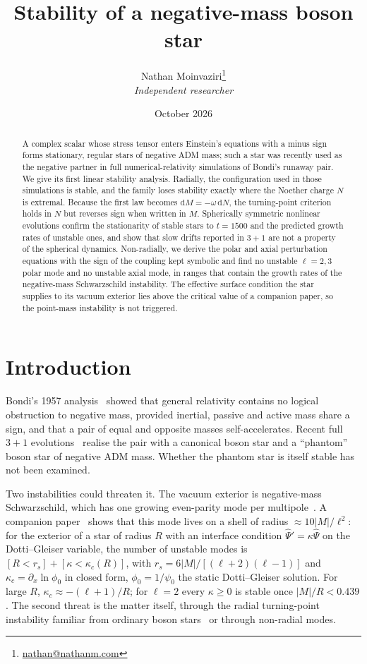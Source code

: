 \documentclass[11pt]{article}
\title{Stability of a negative-mass boson star}
\author{Nathan Moinvaziri\thanks{\href{mailto:nathan@nathanm.com}{nathan@nathanm.com}}\\[2pt]
\normalsize\textit{Independent researcher}}
\date{October 2026}
\theoremstyle{remark}
\newcommand{\dd}{\mathrm{d}}
\begin{document}
\maketitle

\begin{abstract}
A complex scalar whose stress tensor enters Einstein's equations with a minus sign forms stationary, regular stars of
negative ADM mass; such a star was recently used as the negative partner in full numerical-relativity simulations of
Bondi's runaway pair. We give its first linear stability analysis. Radially, the configuration used in those simulations
is stable, and the family loses stability exactly where the Noether charge $N$ is extremal. Because the first law
becomes $\dd M=-\omega\,\dd N$, the turning-point criterion holds in $N$ but reverses sign when written in $M$.
Spherically symmetric nonlinear evolutions confirm the stationarity of stable stars to $t=1500$ and the predicted growth
rates of unstable ones, and show that slow drifts reported in $3+1$ are not a property of the spherical dynamics.
Non-radially, we derive the polar and axial perturbation equations with the sign of the coupling kept symbolic and find
no unstable $\ell=2,3$ polar mode and no unstable axial mode, in ranges that contain the growth rates of the
negative-mass Schwarzschild instability. The effective surface condition the star supplies to its vacuum exterior lies
above the critical value of a companion paper, so the point-mass instability is not triggered.
\end{abstract}

\tableofcontents

\section{Introduction}

Bondi's 1957 analysis~\cite{Bondi1957} showed that general relativity contains no logical obstruction to negative
mass, provided inertial, passive and active mass share a sign, and that a pair of equal and opposite masses
self-accelerates. Recent full $3+1$ evolutions~\cite{Shirokov2026} realise the pair with a canonical boson star and a
``phantom'' boson star of negative ADM mass. Whether the phantom star is itself stable has not been examined.

Two instabilities could threaten it. The vacuum exterior is negative-mass Schwarzschild, which has one growing
even-parity mode per multipole~\cite{GD2006,DG2009}. A companion paper~\cite{Moinvaziri2026a} shows that this mode lives on a
shell of radius $\approx10|M|/\ell^2$: for the exterior of a star of radius $R$ with an interface condition
$\hat\Psi'=\kappa\hat\Psi$ on the Dotti--Gleiser variable, the number of unstable modes is
$[R<r_s]+[\kappa<\kappa_c(R)]$, with $r_s=6|M|/[(\ell+2)(\ell-1)]$ and $\kappa_c=\partial_x\ln\phi_0$ in closed form,
$\phi_0=1/\psi_0$ the static Dotti--Gleiser solution. For large $R$, $\kappa_c\approx-(\ell+1)/R$; for $\ell=2$ every
$\kappa\ge0$ is stable once $|M|/R<0.439$. The second threat is the matter itself, through the radial turning-point
instability familiar from ordinary boson stars~\cite{GW1989,LeePang1989,KMS1991} or through non-radial modes.
\end{document}

